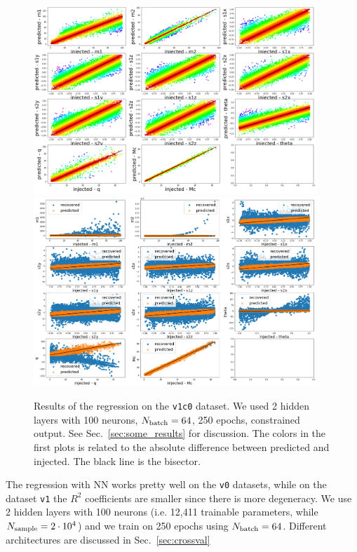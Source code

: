 \documentclass[prd,aps,twocolumn,a4paper,showkeys,nofootinbib]{revtex4-1}
\begin{document}
\begin{figure}[t]
  \center
  \includegraphics[width=0.95\textwidth]{./Figs/v1c0_regression.png}
  \includegraphics[width=0.95\textwidth]{./Figs/v1c0_regression_noise.png}
  \caption{\label{fig:v1c0_results} Results of the regression on the \texttt{v1c0}
  dataset. We used 2 hidden layers with 100 neurons, $N_{\rm batch}=64$, 250 epochs,  
  constrained output. See Sec.~\ref{sec:some_results} for discussion.
  The colors in the first plots is related to the absolute difference between predicted 
  and injected. The black line is the bisector.}
\end{figure}
%
The regression with NN works pretty well on the \texttt{v0} datasets, while on 
the dataset \texttt{v1} the $R^2$ coefficients are smaller since there is more degeneracy.
We use 2 hidden layers with 100 neurons (i.e. 12,411 trainable parameters, while
$N_{\rm sample}=2\cdot 10^4$) and we train on 250 epochs using 
$N_{\rm batch}=64$. Different architectures are discussed in Sec.~\ref{sec:crossval}
\end{document}
